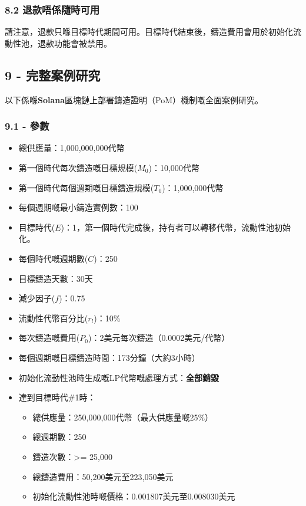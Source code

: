 \documentclass[
]{article}
\providecommand{\tightlist}{%
  \setlength{\itemsep}{0pt}\setlength{\parskip}{0pt}}
\begin{document}
\subsubsection{8.2
退款唔係隨時可用}\label{ux9000ux6b3eux5514ux4fc2ux96a8ux6642ux53efux7528}

請注意，退款只喺目標時代期間可用。目標時代結束後，鑄造費用會用於初始化流動性池，退款功能會被禁用。

\subsection{9 -
完整案例研究}\label{ux5b8cux6574ux6848ux4f8bux7814ux7a76}

以下係喺\textbf{Solana}區塊鏈上部署鑄造證明（PoM）機制嘅全面案例研究。

\subsubsection{9.1 - 參數}\label{ux53c3ux6578}

\begin{itemize}
\tightlist
\item
  總供應量：1,000,000,000代幣
\item
  第一個時代每次鑄造嘅目標規模(\(M_0\))：10,000代幣
\item
  第一個時代每個週期嘅目標鑄造規模(\(T_0\))：1,000,000代幣
\item
  每個週期嘅最小鑄造實例數：100
\item
  目標時代(\(E\))：1，第一個時代完成後，持有者可以轉移代幣，流動性池初始化。
\item
  每個時代嘅週期數(\(C\))：250
\item
  目標鑄造天數：30天
\item
  減少因子(\(f\))：0.75
\item
  流動性代幣百分比(\(r_l\))：10\%
\item
  每次鑄造嘅費用(\(P_0\))：2美元每次鑄造（0.0002美元/代幣）
\item
  每個週期嘅目標鑄造時間：173分鐘（大約3小時）
\item
  初始化流動性池時生成嘅LP代幣嘅處理方式：\textbf{全部銷毀}
\item
  達到目標時代\#1時：

  \begin{itemize}
  \tightlist
  \item
    總供應量：250,000,000代幣（最大供應量嘅25\%）
  \item
    總週期數：250
  \item
    鑄造次數：\textgreater= 25,000
  \item
    總鑄造費用：50,200美元至223,050美元
  \item
    初始化流動性池時嘅價格：0.001807美元至0.008030美元
  \end{itemize}
\end{itemize}
\end{document}
